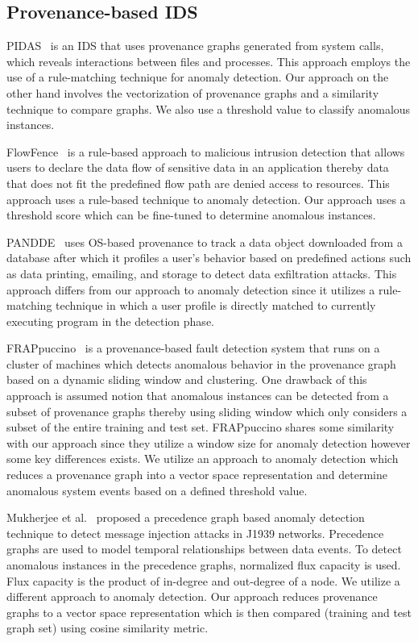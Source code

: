  
 
 \subsection{Provenance-based IDS}
 
PIDAS~\cite{Xie:2016:UID:2936026.2936232} is an IDS that uses provenance graphs generated from system calls, which reveals interactions between files and processes. This approach employs the use of a rule-matching technique for anomaly detection. Our approach on the other hand involves the vectorization of provenance graphs and a similarity technique to compare graphs. We also use a threshold value to classify anomalous instances. 

FlowFence~\cite{197137} is a rule-based approach to malicious intrusion detection that allows users to declare the data flow of sensitive data in an application thereby data that does not fit the predefined flow path are denied access to resources.  This approach uses a rule-based technique to anomaly detection. Our approach uses a threshold score which can be fine-tuned to determine anomalous instances. 

PANDDE~\cite{Fadolalkarim} uses OS-based provenance to track a data object downloaded from a database after which it profiles a user's behavior based on predefined actions such as data printing, emailing, and storage to detect data exfiltration attacks. This approach differs from our approach to anomaly detection since it utilizes a rule-matching technique in which a user profile is directly matched to currently executing program in the detection phase. 

FRAPpuccino~\cite{203308} is a provenance-based fault detection system that runs on a cluster of machines which detects anomalous behavior in the provenance graph based on a dynamic sliding window and clustering. One drawback of this approach is assumed notion that anomalous instances can be detected from a subset of provenance graphs thereby using sliding window which only considers a subset of the entire training and test set. FRAPpuccino shares some similarity with our approach since they utilize a window size for anomaly detection however some key differences exists. We utilize an approach to anomaly detection which reduces a provenance graph into a vector space representation and determine anomalous system events based on a defined threshold value.

Mukherjee et al.~\cite{Mukherjee2017APG} proposed a precedence graph based anomaly detection technique to detect message injection attacks in J1939 networks. Precedence graphs are used to model temporal relationships between data events. To detect anomalous instances in the precedence graphs, normalized flux capacity is used. Flux capacity is the product of in-degree and out-degree of a node. We utilize a different approach to anomaly detection. Our approach reduces provenance graphs to a vector space representation which is then compared (training and test graph set) using cosine similarity metric.

